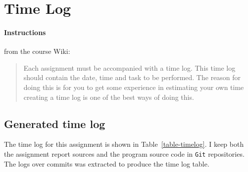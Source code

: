 %
%
%
%


\section{Time Log}\label{time-log}

\paragraph{Instructions}\label{task-3-instructions}
from the course Wiki\cite{1dv600:lab1:instructions}:

\begin{quote}
  Each assignment must be accompanied with a time log. This time log should
  contain the date, time and task to be performed. The reason for doing this is
  for you to get some experience in estimating your own time creating a time
  log is one of the best ways of doing this.
\end{quote}


\subsection{Generated time log}\label{time-log-result}

The time log for this assignment is shown in Table~\ref{table-timelog}.  I keep
both the assignment report \latex sources and the program source code in
\texttt{Git} repositories. The logs over commits was extracted to produce the
time log table.


